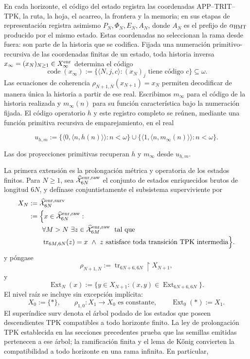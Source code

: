 En cada horizonte, el código del estado registra las coordenadas APP--TRIT--TPK,
la ruta, la hoja, el acarreo, la frontera y la memoria; en sus etapas de
representación registra asimismo \(P_N,\Phi_N,E_N,A_N\), donde
\(A_N\) es el prefijo de \(\alpha_{\rm HMT}\) producido por el mismo estado.
Estas coordenadas no seleccionan la rama desde fuera: son parte de la historia
que se codifica. Fijada una numeración primitivo-recursiva de las coordenadas finitas de
un estado, toda historia inversa
\(x_\infty=(x_N)_{N\geq1}\in X_\infty^{\rm enr}\) determina el código
\[
 \operatorname{code}(x_\infty)
 :=\{\langle N,j,c\rangle:(x_N)_j\text{ tiene código }c\}\subseteq\omega.
\]
Las ecuaciones de coherencia
\(\rho_{N+1,N}(x_{N+1})=x_N\) permiten decodificar de manera única la
historia a partir de ese real. Escribimos \(m_\infty\) para el código de la
historia realizada y \(m_\infty(n)\) para su función característica bajo la
numeración fijada. El código operatorio \(h\) y este registro completo se
reúnen, mediante una función primitiva recursiva de emparejamiento, en el real

\[
 u_{h,m}:=
 \{\langle0,\langle n,h(n)\rangle\rangle:n<\omega\}
 \cup
 \{\langle1,\langle n,m_\infty(n)\rangle\rangle:n<\omega\}.
\tag{C.33a}\label{eq:ch-codigo-conjunto}
\]

Las dos proyecciones primitivas recuperan \(h\) y \(m_\infty\) desde
\(u_{h,m}\).

La primera extensión es la prolongación métrica y operatoria de los estados
finitos. Para \(N\ge1\), sea
\(\widehat{\mathcal X}^{\rm enr,raw}_{6N}\) el conjunto de estados
enriquecidos brutos de longitud \(6N\), y defínase conjuntistamente el
subsistema superviviente por
\[
\begin{aligned}
 X_N
 &:=\widehat{\mathcal X}^{\rm enr,surv}_{6N}\\
 &:=\Bigl\{x\in\widehat{\mathcal X}^{\rm enr,raw}_{6N}:\\[-.2ex]
 &\qquad\forall M>N\ \exists z\in
   \widehat{\mathcal X}^{\rm enr,raw}_{6M}\;\text{ tal que}\\[-.2ex]
 &\qquad\operatorname{tr}_{6M,6N}(z)=x\ \wedge\
   z\text{ satisface toda transición TPK intermedia}\Bigr\}.
\end{aligned}
\]
y póngase
\[
 \rho_{N+1,N}:=\operatorname{tr}_{6N+6,6N}\!\upharpoonright X_{N+1},
\]
y
\[
 \operatorname{Ext}_N(x):=
 \{y\in X_{N+1}:(x,y)\in
 \operatorname{Ext}_{6N+6,6N}\}.
\]
El nivel raíz se incluye sin excepción implícita:
\[
 X_0:=\{\ast\},\qquad
 \rho_{1,0}:X_1\to X_0\text{ es constante},\qquad
 \operatorname{Ext}_0(\ast):=X_1.
\]
El superíndice \(\mathrm{surv}\) denota el
árbol podado de los estados que poseen descendientes TPK compatibles a todo
horizonte finito. La ley de prolongación TPK establecida en las secciones
precedentes prueba que las semillas
emitidas pertenecen a ese árbol; la ramificación finita y el lema de Kőnig
convierten la compatibilidad a todo horizonte en una rama infinita. En
particular,

